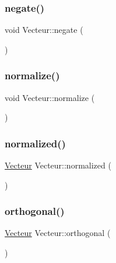 \mbox{\label{classVecteur_a2300d5ef9a10b1e22a319b10137498ba}} 
\subsubsection{\texorpdfstring{negate()}{negate()}}
{\footnotesize\ttfamily void Vecteur\+::negate (\begin{DoxyParamCaption}{ }\end{DoxyParamCaption})}

\mbox{\label{classVecteur_ad4f3a4d85a0df796e16463bcde4d6390}} 
\subsubsection{\texorpdfstring{normalize()}{normalize()}}
{\footnotesize\ttfamily void Vecteur\+::normalize (\begin{DoxyParamCaption}{ }\end{DoxyParamCaption})}

\mbox{\label{classVecteur_ac8918bb8adab4452741c787c0fb805df}} 
\subsubsection{\texorpdfstring{normalized()}{normalized()}}
{\footnotesize\ttfamily \mbox{\hyperlink{classVecteur}{Vecteur}} Vecteur\+::normalized (\begin{DoxyParamCaption}{ }\end{DoxyParamCaption})}

\mbox{\label{classVecteur_a9796d7d70af9bda7c6b6a5ee338304fe}} 
\subsubsection{\texorpdfstring{orthogonal()}{orthogonal()}}
{\footnotesize\ttfamily \mbox{\hyperlink{classVecteur}{Vecteur}} Vecteur\+::orthogonal (\begin{DoxyParamCaption}{ }\end{DoxyParamCaption})}

